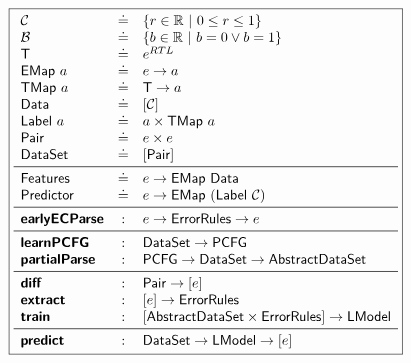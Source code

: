 \begin{figure}[h]
\small
\begin{minipage}[c]{\linewidth}
  \lstDeleteShortInline{|}
  \[
  \boxed{
  \begin{array}{lcl}
    \Conf         & \defeq & \{r \in \R\ |\ 0 \le r \le 1\} \\
    \ConfBin      & \defeq & \{b \in \R\ |\ b = 0 \vee b = 1\} \\
    \T            & \defeq & e^{RTL} \\
    \Emap{a}      & \defeq & e \to a \\
    \Tmap{a}      & \defeq & \T \to a \\
    \datasym      & \defeq & \List{\Conf} \\
    \labelsym{a}  & \defeq & a \times \Tmap{a} \\
    \pairsym      & \defeq & e \times e \\
    \datasetsym   & \defeq & \List{\pairsym} \\
    \midrule
    \featuresym   & \defeq & e \to \Emap{\datasym} \\
    \predictorsym & \defeq & e \to \Emap{(\labelsym{\Conf})} \\
    \midrule
    \ecepsym      & : & e \to \errorrulessym \to e \\
    \midrule
    \learnPCFGsym & : & \datasetsym \to \pcfgsym \\
    \partialsym   & : & \pcfgsym \to \datasetsym \to \abstractdatasetsym \\
    \midrule
    \diffsym      & : & \pairsym \to \List{e} \\
    \extractsym   & : & \List{e} \to \errorrulessym \\
    \trainsym     & : & \List{\abstractdatasetsym \times \errorrulessym} \to \Model \\
    \midrule
    \predictsym   & : & \datasetsym \to \Model \to \List{e} \\
  \end{array}
  }
  \]
  \lstMakeShortInline[mathescape=true]{|}
  \label{fig:api}
\end{minipage}
\end{figure}
